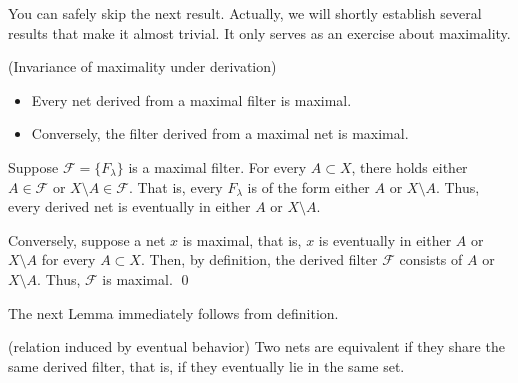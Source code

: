 \documentclass{report}
\begin{document}
You can safely skip the next result. Actually, we will shortly establish several results that make it almost trivial. It only serves as an exercise about maximality.
\begin{exe}\label{invariance maximality} (Invariance of maximality under derivation)
    \begin{itemize}
        \item Every net derived from a maximal filter is maximal.
        \item Conversely, the filter derived from a maximal net is maximal.
    \end{itemize}
\end{exe}
\begin{prf}
    Suppose \( \mathscr{F} = \{F_{\lambda}\} \) is a maximal filter. For every \( A \subset X \), there holds either \( A \in \mathscr{F} \) or \( X \setminus A \in \mathscr{F} \). That is, every \( F_{\lambda} \) is of the form either \( A \) or \( X \setminus A \). Thus, every derived net is eventually in either \( A \) or \( X \setminus A\).

    Conversely, suppose a net \( x \) is maximal, that is, \( x \) is eventually in either \( A \) or \( X \setminus A \) for every \( A \subset X \). Then, by definition, the derived filter \( \mathscr{F} \) consists of \( A \) or \( X \setminus A \). Thus, \( \mathscr{F} \) is maximal.
    \qed\end{prf}

The next Lemma immediately follows from definition.
\begin{lem}\label{classification by eventual} (relation induced by eventual behavior)
    Two nets are equivalent if they share the same derived filter, that is, if they eventually lie in the same set.
\end{lem}
\end{document}
